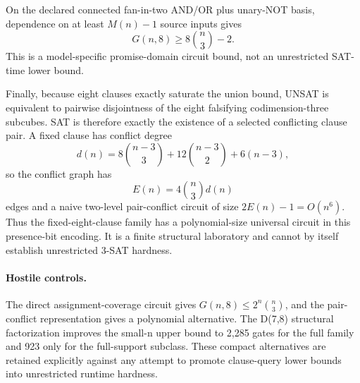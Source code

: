 On the declared connected fan-in-two AND/OR plus unary-NOT basis, dependence on at least \(M(n)-1\) source inputs gives
\[
\boxed{G(n,8)\ge8\binom n3-2}.
\]
This is a model-specific promise-domain circuit bound, not an unrestricted SAT-time lower bound.

Finally, because eight clauses exactly saturate the union bound, UNSAT is equivalent to pairwise disjointness of the eight falsifying codimension-three subcubes. SAT is therefore exactly the existence of a selected conflicting clause pair. A fixed clause has conflict degree
\[
d(n)=8\binom{n-3}{3}+12\binom{n-3}{2}+6(n-3),
\]
so the conflict graph has
\[
E(n)=4\binom n3 d(n)
\]
edges and a naive two-level pair-conflict circuit of size \(2E(n)-1=O(n^6)\). Thus the fixed-eight-clause family has a polynomial-size universal circuit in this presence-bit encoding. It is a finite structural laboratory and cannot by itself establish unrestricted 3-SAT hardness.

\paragraph{Hostile controls.}
The direct assignment-coverage circuit gives \(G(n,8)\le2^n\binom n3\), and the pair-conflict representation gives a polynomial alternative. The D(7,8) structural factorization improves the small-n upper bound to 2,285 gates for the full family and 923 only for the full-support subclass. These compact alternatives are retained explicitly against any attempt to promote clause-query lower bounds into unrestricted runtime hardness.

